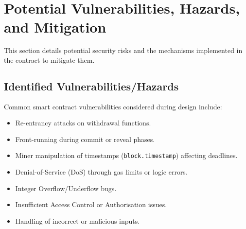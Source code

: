 \documentclass[11pt, a4paper]{article}
\begin{document}
\section{Potential Vulnerabilities, Hazards, and Mitigation}
This section details potential security risks and the mechanisms implemented in the contract to mitigate them.

\subsection{Identified Vulnerabilities/Hazards}
Common smart contract vulnerabilities considered during design include:
\begin{itemize}
    \item Re-entrancy attacks on withdrawal functions.
    \item Front-running during commit or reveal phases.
    \item Miner manipulation of timestamps (\texttt{block.timestamp}) affecting deadlines.
    \item Denial-of-Service (DoS) through gas limits or logic errors.
    \item Integer Overflow/Underflow bugs.
    \item Insufficient Access Control or Authorisation issues.
    \item Handling of incorrect or malicious inputs.
\end{itemize}
\end{document}
